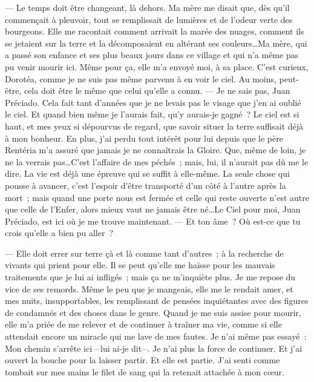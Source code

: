   --- Le temps doit être changeant, là dehors. Ma mère me disait que, dès qu’il commençait à pleuvoir, tout se remplissait de lumières et de l’odeur verte des bourgeons. Elle me racontait comment arrivait la marée des nuages, comment ils se jetaient sur la terre et la décomposaient en altérant ses couleurs\ldots Ma mère, qui a passé son enfance et ses plus beaux jours dans ce village et qui n’a même pas pu venir mourir ici. Même pour ça, elle m’a envoyé moi, à sa place. C’est curieux, Dorotéa, comme je ne suis pas même parvenu à en voir le ciel. Au moins, peut-être, cela doit être le même que celui qu’elle a connu.
\pend
%
\pstart
  --- Je ne sais pas, Juan Préciado. Cela fait tant d’années que je ne levais pas le visage que j’en ai oublié le ciel. Et quand bien même je l'aurais fait, qu’y aurais-je gagné ? Le ciel est si haut, et mes yeux si dépourvus de regard, que savoir situer la terre suffisait déjà à mon bonheur. En plus, j’ai perdu tout intérêt pour lui depuis que le père Rentéria m’a assuré que jamais je ne connaîtrais la Gloire. Que, même de loin, je ne la verrais pas\ldots C’est l’affaire de mes péchés ; mais, lui, il n’aurait pas dû me le dire. La vie est déjà une épreuve qui se suffit à elle-même. La seule chose qui pousse à avancer, c’est l’espoir d’être transporté d’un côté à l’autre après la mort ; mais quand une porte nous est fermée et celle qui reste ouverte n'est autre que celle de l'Enfer, alors mieux vaut ne jamais être né\ldots Le Ciel pour moi, Juan Préciado, est ici où je me trouve maintenant.
\pend
%
\pstart
  --- Et ton âme ? Où est-ce que tu crois qu’elle a bien pu aller ?

  --- Elle doit errer sur terre çà et là comme tant d’autres ; à la recherche de vivants qui prient pour elle. Il se peut qu’elle me haïsse pour les mauvais traitements que je lui ai infligés ; mais ça ne m’inquiète plus. Je me repose du vice de ses remords. Même le peu que je mangeais, elle me le rendait amer, et mes nuits, insupportables, les remplissant de pensées inquiétantes avec des figures de condamnés et des choses dans le genre. Quand je me suis assise pour mourir, elle m’a priée de me relever et de continuer à traîner ma vie, comme si elle attendait encore un miracle qui me lave de mes fautes. Je n’ai même pas essayé : \og{}Mon chemin s’arrête ici --\,lui ai-je dit\,--. Je n'ai plus la force de continuer.\fg{} Et j’ai ouvert la bouche pour la laisser partir. Et elle est partie. J’ai senti comme tombait sur mes mains le filet de sang qui la retenait attachée à mon cœur. %
\pend

